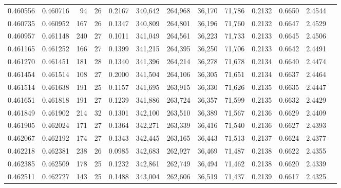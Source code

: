 \begin{tabular}{rrrrrrrrrrrrr}
0.460556 & 0.460716 &     94 &    26 &                                     0.2167 & 340,642 & 264,968 &  36,170 &  71,786 & 0.2132 & 0.6650 & 2.4544 \\
0.460735 & 0.460952 &    167 &    26 &                                     0.1347 & 340,809 & 264,801 &  36,196 &  71,760 & 0.2132 & 0.6647 & 2.4529 \\
0.460957 & 0.461148 &    240 &    27 &                                     0.1011 & 341,049 & 264,561 &  36,223 &  71,733 & 0.2133 & 0.6645 & 2.4506 \\
0.461165 & 0.461252 &    166 &    27 &                                     0.1399 & 341,215 & 264,395 &  36,250 &  71,706 & 0.2133 & 0.6642 & 2.4491 \\
0.461270 & 0.461451 &    181 &    28 &                                     0.1340 & 341,396 & 264,214 &  36,278 &  71,678 & 0.2134 & 0.6640 & 2.4474 \\
0.461454 & 0.461514 &    108 &    27 &                                     0.2000 & 341,504 & 264,106 &  36,305 &  71,651 & 0.2134 & 0.6637 & 2.4464 \\
0.461514 & 0.461638 &    191 &    25 &                                     0.1157 & 341,695 & 263,915 &  36,330 &  71,626 & 0.2135 & 0.6635 & 2.4447 \\
0.461651 & 0.461818 &    191 &    27 &                                     0.1239 & 341,886 & 263,724 &  36,357 &  71,599 & 0.2135 & 0.6632 & 2.4429 \\
0.461849 & 0.461902 &    214 &    32 &                                     0.1301 & 342,100 & 263,510 &  36,389 &  71,567 & 0.2136 & 0.6629 & 2.4409 \\
0.461905 & 0.462024 &    171 &    27 &                                     0.1364 & 342,271 & 263,339 &  36,416 &  71,540 & 0.2136 & 0.6627 & 2.4393 \\
0.462067 & 0.462192 &    174 &    27 &                                     0.1343 & 342,445 & 263,165 &  36,443 &  71,513 & 0.2137 & 0.6624 & 2.4377 \\
0.462218 & 0.462381 &    238 &    26 &                                     0.0985 & 342,683 & 262,927 &  36,469 &  71,487 & 0.2138 & 0.6622 & 2.4355 \\
0.462385 & 0.462509 &    178 &    25 &                                     0.1232 & 342,861 & 262,749 &  36,494 &  71,462 & 0.2138 & 0.6620 & 2.4339 \\
0.462511 & 0.462727 &    143 &    25 &                                     0.1488 & 343,004 & 262,606 &  36,519 &  71,437 & 0.2139 & 0.6617 & 2.4325 \\

\end{tabular}
